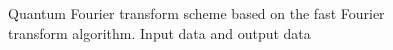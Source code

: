 \begin{figure}
\centering



\caption{Quantum Fourier transform scheme based on the fast Fourier transform algorithm. Input data and output data}
\label{figQuantCompQuantFourier0}
\end{figure}